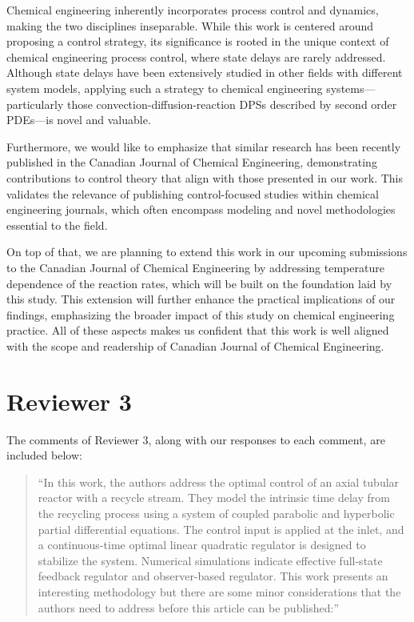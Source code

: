 \documentclass[11pt,answers]{exam}
\begin{document}
\begin{questions}
\begin{solutionorbox}
        Chemical engineering inherently incorporates process control and dynamics, making the two disciplines inseparable. While this work is centered around proposing a control strategy, its significance is rooted in the unique context of chemical engineering process control, where state delays are rarely addressed. Although state delays have been extensively studied in other fields with different system models, applying such a strategy to chemical engineering systems—particularly those convection-diffusion-reaction DPSs described by second order PDEs—is novel and valuable. 
        
        Furthermore, we would like to emphasize that similar research \cite{li2024novel, azhin2021modelling} has been recently published in the Canadian Journal of Chemical Engineering, demonstrating contributions to control theory that align with those presented in our work. This validates the relevance of publishing control-focused studies within chemical engineering journals, which often encompass modeling and novel methodologies essential to the field.

        On top of that, we are planning to extend this work in our upcoming submissions to the Canadian Journal of Chemical Engineering by addressing temperature dependence of the reaction rates, which will be built on the foundation laid by this study. This extension will further enhance the practical implications of our findings, emphasizing the broader impact of this study on chemical engineering practice. All of these aspects makes us confident that this work is well aligned with the scope and readership of Canadian Journal of Chemical Engineering.
    \end{solutionorbox}

\end{questions}

\newpage
\section*{Reviewer 3}

The comments of Reviewer 3, along with our responses to each comment, are included below:

\begin{quote}
    ``In this work, the authors address the optimal control of an axial tubular reactor with a recycle stream. They model the intrinsic time delay from the recycling process using a system of coupled parabolic and hyperbolic partial differential equations. The control input is applied at the inlet, and a continuous-time optimal linear quadratic regulator is designed to stabilize the system. Numerical simulations indicate effective full-state feedback regulator and observer-based regulator. This work presents an interesting methodology but there are some minor considerations that the authors need to address before this article can be published:''
\end{quote}
\end{document}
